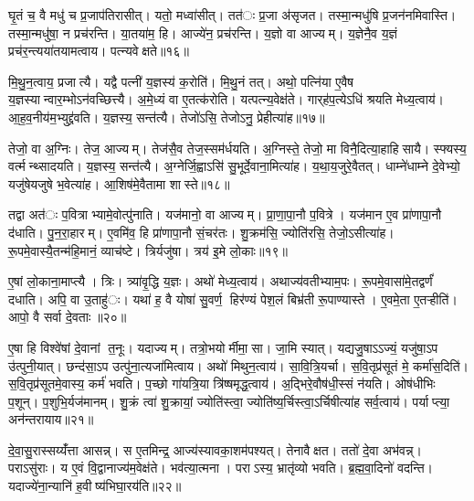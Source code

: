 
घृ॒तं च॒ वै मधु॑ च प्र॒जाप॑तिरासीत्। यतो॒ मध्वा॑सीत्। तत॑ः प्र॒जा अ॑सृजत। तस्मा॒न्मधु॑षि प्र॒जन॑नमिवास्ति। तस्मा॒न्मधु॑षा॒ न प्रच॑रन्ति। या॒तया॑म॒ हि। आज्ये॑न॒ प्रच॑रन्ति। य॒ज्ञो वा आज्यम्। य॒ज्ञेनै॒व य॒ज्ञं प्रच॑र॒न्त्यया॑तयामत्वाय। पत्न्यवेक्षते॥१६॥

मि॒थु॒न॒त्वाय॒ प्रजात्यै। यद्वै पत्नी॑ य॒ज्ञस्य॑ क॒रोति॑। मि॒थु॒नं तत्। अथो॒ पत्नि॑या ए॒वैष य॒ज्ञस्यान्वार॒म्भोऽन॑वच्छित्त्यै। अ॒मे॒ध्यं वा ए॒तत्क॑रोति। यत्पत्न्य॒वेक्ष॑ते। गार्‌ह॑प॒त्येऽधि॑ श्रयति मेध्य॒त्वाय॑। आ॒ह॒व॒नीय॑म॒भ्युद्द्र॑वति। य॒ज्ञस्य॒ सन्त॑त्यै। तेजो॑ऽसि॒ तेजोऽनु॒ प्रेहीत्या॑ह॥१७॥

तेजो॒ वा अ॒ग्निः। तेज॒ आज्यम्। तेज॑सै॒व तेज॒स्सम॑र्धयति। अ॒ग्निस्ते॒ तेजो॒ मा विनै॒दित्या॒हाहिसायै। स्फ्यस्य॒ वर्त्मन्थ्सादयति। य॒ज्ञस्य॒ सन्त॑त्यै। अ॒ग्नेर्जि॒ह्वाऽसि॑ सु॒भूर्दे॒वाना॒मित्या॑ह। य॒था॒य॒जुरे॒वैतत्। धाम्ने॑धाम्ने दे॒वेभ्यो॒ यजु॑षेयजुषे भ॒वेत्या॑ह। आ॒शिष॑मे॒वैतामा शास्ते॥१८॥

तद्वा अत॑ः प॒वित्राभ्यामे॒वोत्पु॑नाति। यज॑मानो॒ वा आज्यम्। प्रा॒णा॒पा॒नौ प॒वित्रे। यज॑मान ए॒व प्रा॑णापा॒नौ द॑धाति। पु॒न॒रा॒हारम्। ए॒वमि॑व॒ हि प्रा॑णापा॒नौ सं॒चर॑तः। शु॒क्रम॑सि॒ ज्योति॑रसि॒ तेजो॒ऽसीत्या॑ह। रू॒पमे॒वास्यै॒तन्म॑हि॒मानं॒ व्याच॑ष्टे। त्रिर्यजु॑षा। त्रय॑ इ॒मे लो॒काः॥१९॥

ए॒षां लो॒काना॒माप्त्यै। त्रिः। त्र्या॑वृ॒द्धि य॒ज्ञः। अथो॑ मेध्य॒त्वाय॑। अथाज्य॑वतीभ्याम॒पः। रू॒पमे॒वासा॑मे॒तद्वर्णं॑ दधाति। अपि॒ वा उ॒ताहु॑ः। यथा॑ ह॒ वै योषा॑ सु॒वर्ण॒ हिर॑ण्यं पेश॒लं बिभ्र॑ती रू॒पाण्यास्ते। ए॒वमे॒ता ए॒तऱ्हीति॑। आपो॒ वै सर्वा दे॒वताः॥२०॥

ए॒षा हि विश्वे॑षां दे॒वानां त॒नूः। यदाज्यम्। तत्रो॒भयोर्मीमा॒सा। जा॒मि स्यात्। यद्यजु॒षाऽऽज्यं॒ यजु॑षा॒ऽप उ॑त्पुनी॒यात्। छन्द॑सा॒ऽप उत्पु॑ना॒त्यजा॑मित्वाय। अथो॑ मिथुन॒त्वाय॑। सा॒वि॒त्रि॒यर्चा। स॒वि॒तृप्र॑सूतं मे॒ कर्मा॑स॒दिति॑। स॒वि॒तृप्र॑सूतमे॒वास्य॒ कर्म॑ भवति। प॒च्छो गा॑यत्रि॒या त्रि॑ष्षमृद्ध॒त्वाय॑। अ॒द्भिरे॒वौष॑धी॒स्सं न॑यति। ओष॑धीभिः प॒शून्। प॒शुभि॒र्यज॑मानम्। शु॒क्रं त्वा॑ शु॒क्रायां॒ ज्योति॑स्त्वा॒ ज्योति॑ष्य॒र्चिस्त्वा॒ऽर्चिषीत्या॑ह सर्व॒त्वाय॑। पर्याप्त्या॒ अन॑न्तरायाय॥२१॥


दे॒वा॒सु॒रास्सय्यँ॑त्ता आसन्न्। स ए॒तमिन्द्र॒ आज्य॑स्यावका॒शम॑पश्यत्। तेनावैक्षत। ततो॑ दे॒वा अभ॑वन्न्। पराऽसु॑राः। य ए॒वं वि॒द्वानाज्य॑म॒वेक्ष॑ते। भव॑त्या॒त्मना। पराऽस्य॒ भ्रातृ॑व्यो भवति। ब्र॒ह्म॒वा॒दिनो॑ वदन्ति। यदाज्ये॑ना॒न्यानि॑ ह॒वीष्य॑भिघा॒रय॑ति॥२२॥

